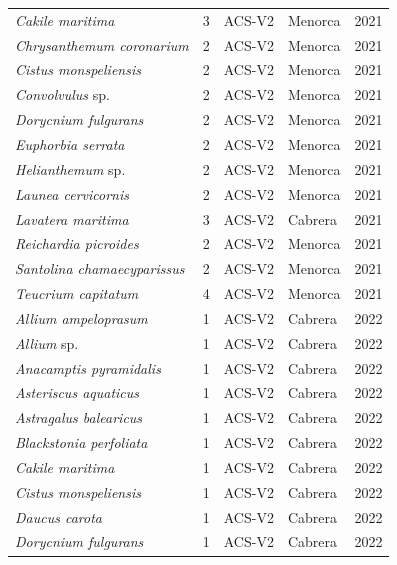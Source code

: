 \documentclass[]{article}
\renewcommand{\(}{\left(}
\renewcommand{\)}{\right)}
\renewcommand{\[}{\left[}
\renewcommand{\]}{\right]}
\begin{document}
\begin{longtable}{l r l l r}
    \textit{Cakile maritima}               & 3 & ACS-V2    & Menorca    & 2021 \\
    \textit{Chrysanthemum coronarium}      & 2 & ACS-V2    & Menorca    & 2021 \\
   \textit{ Cistus monspeliensis}          & 2 & ACS-V2    & Menorca    & 2021 \\
    \textit{Convolvulus} sp.                   & 2 & ACS-V2    & Menorca    & 2021 \\
    \textit{Dorycnium fulgurans}           & 2 & ACS-V2    & Menorca    & 2021 \\
    \textit{Euphorbia serrata}             & 2 & ACS-V2    & Menorca    & 2021 \\
    \textit{Helianthemum} sp.               & 2 & ACS-V2    & Menorca    & 2021 \\
    \textit{Launea cervicornis}            & 2 & ACS-V2    & Menorca    & 2021 \\
    \textit{Lavatera maritima}             & 3 & ACS-V2    & Cabrera    & 2021 \\
    \textit{Reichardia picroides}          & 2 & ACS-V2    & Menorca    & 2021 \\
    \textit{Santolina chamaecyparissus}    & 2 & ACS-V2    & Menorca    & 2021 \\
    \textit{Teucrium capitatum}            & 4 & ACS-V2    & Menorca    & 2021 \\
    \textit{Allium ampeloprasum}          & 1 & ACS-V2    & Cabrera    & 2022 \\
    \textit{Allium} sp.                     & 1 & ACS-V2    & Cabrera    & 2022 \\
    \textit{Anacamptis pyramidalis}        & 1 & ACS-V2    & Cabrera    & 2022 \\
    \textit{Asteriscus aquaticus}          & 1 & ACS-V2    & Cabrera    & 2022 \\
    \textit{Astragalus balearicus}         & 1 & ACS-V2    & Cabrera    & 2022 \\
    \textit{Blackstonia perfoliata}        & 1 & ACS-V2    & Cabrera    & 2022 \\
    \textit{Cakile maritima}               & 1 & ACS-V2    & Cabrera    & 2022 \\
    \textit{Cistus monspeliensis}          & 1 & ACS-V2    & Cabrera    & 2022 \\
    \textit{Daucus carota}                 & 1 & ACS-V2    & Cabrera    & 2022 \\
    \textit{Dorycnium fulgurans}           & 1 & ACS-V2    & Cabrera    & 2022 \\

\end{longtable}
\end{document}
